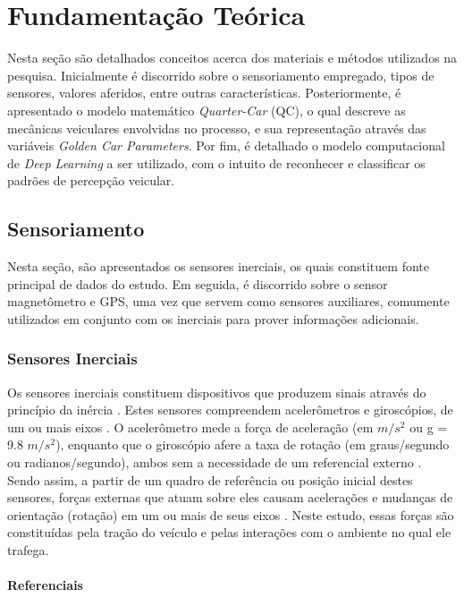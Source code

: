 \chapter{Fundamentação Teórica}
\label{cap:fundamentacao}

Nesta seção são detalhados conceitos acerca dos materiais e métodos utilizados na pesquisa. Inicialmente é discorrido sobre o sensoriamento empregado, tipos de sensores, valores aferidos, entre outras características. Posteriormente, é apresentado o modelo matemático \textit{Quarter-Car} (QC), o qual descreve as mecânicas veiculares envolvidas no processo, e sua representação através das variáveis \textit{Golden Car Parameters}. Por fim, é detalhado o modelo computacional de \textit{Deep Learning} a ser utilizado, com o intuito de reconhecer e classificar os padrões de percepção veicular.

\section{Sensoriamento}

Nesta seção, são apresentados os sensores inerciais, os quais constituem fonte principal de dados do estudo. Em seguida, é discorrido sobre o sensor magnetômetro e GPS, uma vez que servem como sensores auxiliares, comumente utilizados em conjunto com os inerciais para prover informações adicionais. 

\subsection{Sensores Inerciais}

Os sensores inerciais constituem dispositivos que produzem sinais através do princípio da inércia \cite{Braga2017}. Estes sensores compreendem acelerômetros e giroscópios, de um ou mais eixos \cite{Beeby2004}. O acelerômetro mede a força de aceleração (em $m/s^2$ ou g = 9.8 $m/s^2$), enquanto que o giroscópio afere a taxa de rotação (em graus/segundo ou radianos/segundo), ambos sem a necessidade de um referencial externo \cite{Groves2013}. Sendo assim, a partir de um quadro de referência ou posição inicial destes sensores, forças externas que atuam sobre eles causam acelerações e mudanças de orientação (rotação) em um ou mais de seus eixos \cite{Kempe2011}. Neste estudo, essas forças são constituídas pela tração do veículo e pelas interações com o ambiente no qual ele trafega.

\subsubsection{Referenciais}

